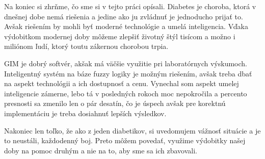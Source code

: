 Na koniec si zhrňme, čo sme si v tejto práci opísali. Diabetes je choroba, ktorá v dnešnej dobe nemá riešenia a jedine ako ju zvládnuť je jednoducho prijať to. Avšak riešením by mohli byť moderné technológie a umelá inteligencia.
Vďaka výdobitkom modernej doby môžeme zlepšiť životný štýl tisícom a možno i miliónom ľudí, ktorý toutu zákernou chorobou trpia.

GIM je dobrý softvér, akšak má väčšie využitie pri laboratórnych výskumoch. Inteligentný systém na báze fuzzy logiky je možným riešením, avšak treba dbať na aspekt technológii a ich dostupnosť a cenu. Vynechal som aspekt umelej inteligencie zámerne, lebo tá v posledných rokoch moc nepokročila a percento presnosti sa zmenilo len o pár desatín, čo je úspech avšak pre korektnú implementáciu je treba dosiahnuť lepších výsledkov.

Nakoniec len toľko, že ako z jeden diabetikov, si uvedomujem vážnosť situácie a je to neustáli, každodenný boj.
Preto môžem povedať, využime výdobitky našej doby na pomoc druhým a nie na to, aby sme sa ich zbavovali.